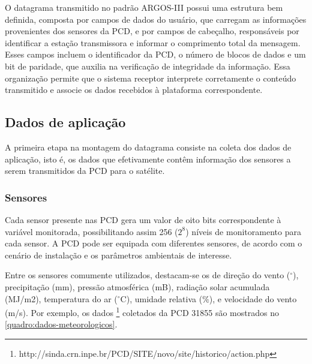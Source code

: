 O datagrama transmitido no padrão \gls{ARGOS-III} possui uma estrutura bem definida, composta por campos de dados do usuário, que carregam as informações provenientes dos sensores da \gls{PCD}, e por campos de cabeçalho, responsáveis por identificar a estação transmissora e informar o comprimento total da mensagem. Esses campos incluem o identificador da PCD, o número de blocos de dados e um bit de paridade, que auxilia na verificação de integridade da informação. Essa organização permite que o sistema receptor interprete corretamente o conteúdo transmitido e associe os dados recebidos à plataforma correspondente.


\subsection{Dados de aplicação}

A primeira etapa na montagem do datagrama consiste na coleta dos dados de aplicação, isto é, os dados que efetivamente contêm informação dos sensores a serem transmitidos da \gls{PCD} para o satélite.

\subsubsection{Sensores}

Cada sensor presente nas \gls{PCD} gera um valor de oito bits correspondente à variável monitorada, possibilitando assim 256 ($2^8$) níveis de monitoramento para cada sensor. A PCD pode ser equipada com diferentes sensores, de acordo com o cenário de instalação e os parâmetros ambientais de interesse. 

Entre os sensores comumente utilizados, destacam-se os de direção do vento ($^{\circ}$), precipitação (mm), pressão atmosférica (mB), radiação solar acumulada (MJ/m2), temperatura do ar ($^{\circ}\text{C}$), umidade relativa ($\%$), e velocidade do vento (m/s). Por exemplo, os dados \footnote{http://sinda.crn.inpe.br/PCD/SITE/novo/site/historico/action.php} coletados da PCD 31855 são mostrados no \autoref{quadro:dados-meteorologicos}.


